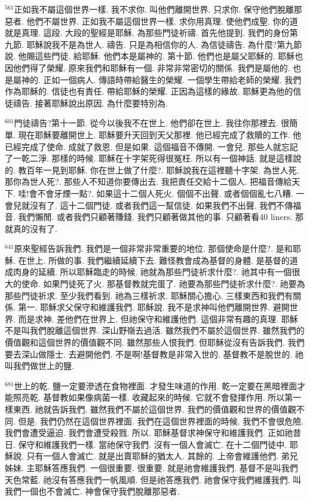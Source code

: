 \documentclass{book}
\begin{document}
$^{561}$正如我不屬這個世界一樣.
我不求你.
叫他們離開世界.
只求你.
保守他們脫離那惡者.
他們不屬世界.
正如我不屬這個世界一樣.
求你用真理.
使他們成聖.
你的道就是真理.
這段.
大段的聖經是耶穌.
為那些門徒祈禱.
首先他提到.
我們的身份第九節.
耶穌說我不是為世人.
禱告.
只是為相信你的人.
為信徒禱告.
為什麼?第九節說.
他賜這些門徒.
給耶穌.
他們本是屬神的.
第十節.
他們也是屬父耶穌的.
耶穌也因他們得了榮耀.
原來我們和耶穌有一個.
非常非常密切的關係.
我們是屬他的.
也是屬神的.
正如一個病人.
傳語時帶給醫生的榮耀.
一個學生帶給老師的榮耀.
我們作為耶穌的.
信徒也有責任.
帶給耶穌的榮耀.
正因為這樣的緣故.
耶穌更為他的信徒禱告.
接著耶穌說出原因.
為什麼要特別為.

$^{601}$門徒禱告?第十一節.
從今以後我不在世上.
他們卻在世上.
我往你那裡去.
很簡單.
現在耶穌要離開世上.
耶穌要升天回到天父那裡.
他已經完成了救贖的工作.
他已經完成了使命.
成就了救恩.
但是如果.
這個福音不傳開.
一會兒.
那些人就忘記了一乾二淨.
那樣的時候.
耶穌在十字架死得很冤枉.
所以有一個神話.
就是這樣說的.
教百年一見到耶穌.
你在世上做了什麼?.
耶穌說我在這裡聽十字架.
為世人死.
那你為世人死?.
那些人不知道你要傳出去.
我把責任交給十二個人.
把福音傳給天下.
哇!會不會牙煙一點?.
如果這十二個人死火.
個個不出聲.
或者個個亂七八糟.
一會兒就沒有了.
這十二個門徒.
或者我們這一幫信徒.
如果我們不出聲.
我們不傳福音.
我們懶閒.
或者我們只顧著賺錢.
我們只顧著做其他的事.
只顧著看40 liners.
那就真的沒有了.

$^{641}$原來聖經告訴我們.
我們是一個非常非常重要的地位.
那個使命是什麼?.
是和耶穌.
在世上.
所做的事.
我們繼續延續下去.
難怪教會成為基督的身體.
是基督的道成肉身的延續.
所以耶穌臨走的時候.
祂就為那些門徒祈求什麼?.
祂其中有一個很大的使命.
如果門徒死了火.
那基督教就完蛋了.
祂要為那些門徒祈求什麼?.
祂要為那些門徒祈求.
至少我們看到.
祂為三樣祈求.
耶穌關心擔心.
三樣東西和我們有關係.
第一.
耶穌求父保守和維護我們.
耶穌說.
我不是求神叫他們離開世界.
避開世界.
而是求神.
差他們在世界上.
但祂保守和維護他們.
這個非常有趣的真理.
耶穌不是叫我們脫離這個世界.
深山野嶺去過活.
雖然我們不屬於這個世界.
雖然我們的價值觀和這個世界的價值觀不同.
雖然那些人恨我們.
但耶穌從沒有告訴我們.
我們要去深山做隱士.
去避開他們.
不是啊!基督教是非常入世的.
基督教不是脫世的.
祂叫我們做世上的鹽.

$^{681}$世上的乾.
鹽一定要滲透在食物裡面.
才發生味道的作用.
乾一定要在黑暗裡面才能照亮乾.
基督教如果像病菌一樣.
收藏起來的時候.
它就不會發揮作用.
所以第一樣東西.
祂就告訴我們.
雖然我們不屬於這個世界.
我們的價值觀和世界的價值觀不同.
但是.
我們仍然在這個世界裡面.
我們在這個世界裡面的時候.
我們不會很危險.
我們會遭受逼迫.
我們會遭受殺戮.
所以.
耶穌基督求神保守和維護我們.
正如祂昔日.
保守和維護我們一樣.
當祂保守我們.
沒有一個人會滅亡.
在十二個門徒中.
耶穌說.
只有一個人會滅亡.
就是出賣耶穌的猶太人.
其餘的.
上帝會維護他們.
弟兄姊妹.
主耶穌答應我們.
一個很重要.
很重要.
就是祂會維護我們.
基督不是叫我們天色常藍.
祂沒有答應我們一帆風順.
但是祂答應我們.
祂會保守我們維護我們.
叫我們一個也不會滅亡.
神會保守我們脫離那惡者.
\end{document}
